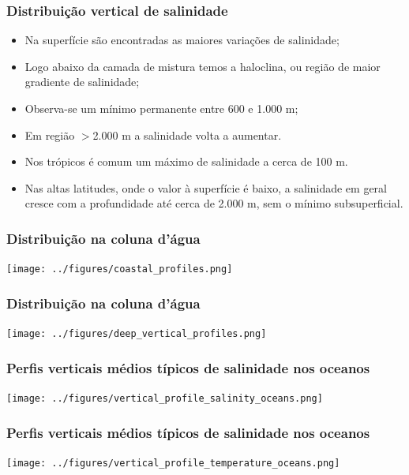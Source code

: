 \begin{frame}
  \frametitle{Distribuição vertical de salinidade}
  \small{
  \begin{itemize}[<+-| alert@+>]
    \item Na superfície são encontradas as maiores variações de salinidade;
    \item Logo abaixo da camada de mistura temos a haloclina, ou região de
          maior gradiente de salinidade;
    \item Observa-se um mínimo permanente entre 600 e 1.000 m;
    \item Em região $>$2.000 m a salinidade volta a aumentar.
    \item Nos trópicos é comum um máximo de salinidade a cerca de 100 m.
    \item Nas altas latitudes, onde o valor à superfície é baixo, a salinidade
          em geral cresce com a profundidade até cerca de 2.000 m, sem o mínimo
          subsuperficial.
  \end{itemize}
  }
\end{frame}


\begin{frame}
\frametitle{Distribuição na coluna d'água}
  \begin{center}
    \texttt{[image: ../figures/coastal\_profiles.png]}
  \end{center}
\end{frame}


\begin{frame}
\frametitle{Distribuição na coluna d'água}
  \begin{center}
    \texttt{[image: ../figures/deep\_vertical\_profiles.png]}
  \end{center}
\end{frame}


\begin{frame}
\frametitle{Perfis verticais médios típicos de salinidade nos oceanos}
  \begin{center}
    \texttt{[image: ../figures/vertical\_profile\_salinity\_oceans.png]}
  \end{center}
\end{frame}


\begin{frame}
\frametitle{Perfis verticais médios típicos de salinidade nos oceanos}
  \begin{center}
    \texttt{[image: ../figures/vertical\_profile\_temperature\_oceans.png]}
  \end{center}
\end{frame}


